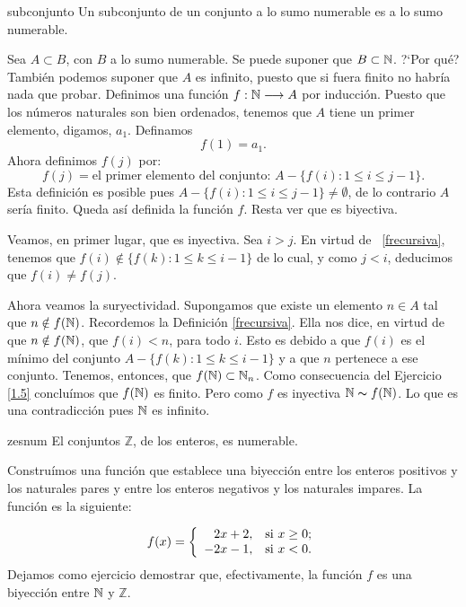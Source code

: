 \begin{proposicion}{subconjunto} Un subconjunto de un conjunto a lo sumo numerable es a
lo sumo numerable.
\end{proposicion}
\begin{demo} Sea $A\subset B$, con $B$ a lo sumo numerable. Se puede suponer
que $B\subset \mathbb{N}$. ?`Por qué? También podemos suponer que
$A$ es infinito, puesto que si fuera finito no habría nada
que probar. Definimos una función $f:\mathbb{N} \longrightarrow A$ por
inducción. Puesto que los números naturales son bien ordenados,
tenemos que $A$ tiene un primer elemento, digamos, $a_1$.
Definamos
\[f(1)=a_1.\]
Ahora definimos $f(j)$ por:
\begin{equation}\label{frecursiva}
f(j)=\text{el primer elemento del conjunto: }A-\{f(i):1\leq i\leq
j-1\}. \end{equation} Esta definición es posible pues
$A-\{f(i):1\leq i\leq j-1\}\neq\emptyset$, de lo contrario $A$
sería finito. Queda así definida la función $f$. Resta
ver que es biyectiva.

Veamos, en primer lugar, que es inyectiva. Sea $i>j$. En virtud de
~\eqref{frecursiva}, tenemos que $f(i)\notin\{f(k):1\leq k\leq
i-1\}$ de lo cual, y como $j<i$, deducimos que $f(i)\neq f(j)$.

Ahora veamos la suryectividad. Supongamos que existe un elemento
$n\in A$ tal que $n\notin f(\mathbb{N})$. Recordemos la Definición
\eqref{frecursiva}. Ella nos dice, en virtud de que $n\notin
f(\mathbb{N})$, que $f(i)<n$, para todo $i$. Esto es debido a que $f(i)$
es el mínimo del conjunto $ A-\{f(k):1\leq k\leq i-1\}$ y a
que $n$ pertenece a ese conjunto. Tenemos, entonces, que
$f(\mathbb{N})\subset\mathbb{N}_n$. Como consecuencia del Ejercicio \vref{1.5}
concluímos que $f(\mathbb{N})$ es finito. Pero como $f$ es inyectiva
$\mathbb{N}\thicksim f(\mathbb{N})$. Lo que es una contradicción pues $\mathbb{N}$ es
infinito.
\end{demo}

\begin{proposicion}{zesnum}
El conjuntos $\mathbb{Z}$, de los enteros,  es numerable.
\end{proposicion}
\begin{demo} Construímos una función que establece
una biyección entre los enteros positivos y los naturales pares
y entre los enteros negativos y los naturales impares. La
función es la siguiente:

\[f(x)=
\left\{
\begin{array}{rl}
    2x+2, & \hbox{si $x\geq 0$;} \\
    -2x-1, & \hbox{si $x<0$.} \\
\end{array}
\right.
\] 
Dejamos como ejercicio demostrar que, efectivamente, la
función $f$ es una biyección entre $\mathbb{N}$ y $\mathbb{Z}$.
\end{demo}

